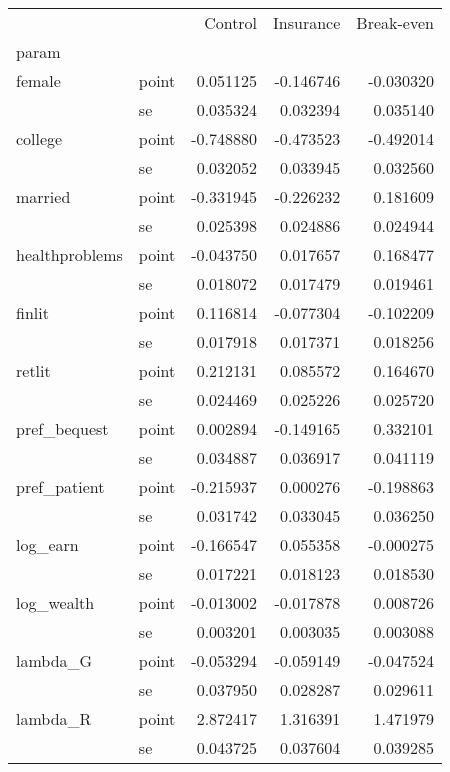 \begin{tabular}{llrrr}
\toprule
        &    &   Control &  Insurance &  Break-even \\
param & {} &           &            &             \\
\midrule
female & point &  0.051125 &  -0.146746 &   -0.030320 \\
        & se &  0.035324 &   0.032394 &    0.035140 \\
college & point & -0.748880 &  -0.473523 &   -0.492014 \\
        & se &  0.032052 &   0.033945 &    0.032560 \\
married & point & -0.331945 &  -0.226232 &    0.181609 \\
        & se &  0.025398 &   0.024886 &    0.024944 \\
healthproblems & point & -0.043750 &   0.017657 &    0.168477 \\
        & se &  0.018072 &   0.017479 &    0.019461 \\
finlit & point &  0.116814 &  -0.077304 &   -0.102209 \\
        & se &  0.017918 &   0.017371 &    0.018256 \\
retlit & point &  0.212131 &   0.085572 &    0.164670 \\
        & se &  0.024469 &   0.025226 &    0.025720 \\
pref\_bequest & point &  0.002894 &  -0.149165 &    0.332101 \\
        & se &  0.034887 &   0.036917 &    0.041119 \\
pref\_patient & point & -0.215937 &   0.000276 &   -0.198863 \\
        & se &  0.031742 &   0.033045 &    0.036250 \\
log\_earn & point & -0.166547 &   0.055358 &   -0.000275 \\
        & se &  0.017221 &   0.018123 &    0.018530 \\
log\_wealth & point & -0.013002 &  -0.017878 &    0.008726 \\
        & se &  0.003201 &   0.003035 &    0.003088 \\
lambda\_G & point & -0.053294 &  -0.059149 &   -0.047524 \\
        & se &  0.037950 &   0.028287 &    0.029611 \\
lambda\_R & point &  2.872417 &   1.316391 &    1.471979 \\
        & se &  0.043725 &   0.037604 &    0.039285 \\

\end{tabular}
